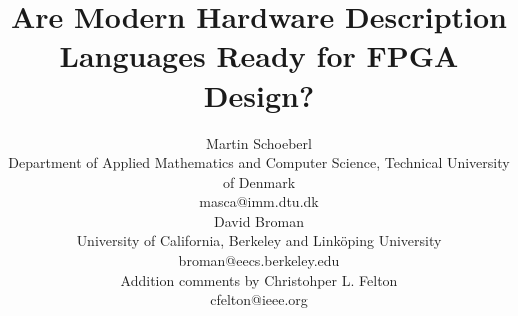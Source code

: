 \documentclass[10pt, technote, draftcls, onecolumn]{IEEEtran}
\begin{document}
\newcommand{\shdl} {
  \lstset{keywords={comp,end,def,in,out,if,then,else,true,false,
      int,real,bool,string,int1,int2,int3,int4,int5,int6,int7,int8,
      int16,int32,type}, 
    morecomment=[l]{//},
    morecomment=[s]{/*}{*/}, morestring=[b]{"},
    basicstyle=\ttfamily\small, showstringspaces=false,
    keywordstyle=\bfseries, mathescape=true, }}



\title{Are Modern Hardware Description Languages Ready for FPGA Design?}
\author{Martin Schoeberl\\
Department of Applied Mathematics and Computer Science, 
Technical University of Denmark\\masca@imm.dtu.dk
  \vspace{1ex}\\ 
David Broman\\
University of California, Berkeley and Link{\"o}ping University\\
broman@eecs.berkeley.edu
   \vspace{1ex}\\ 
Addition comments by Christohper L. Felton\\
cfelton@ieee.org
}



\maketitle \thispagestyle{empty}
\end{document}
